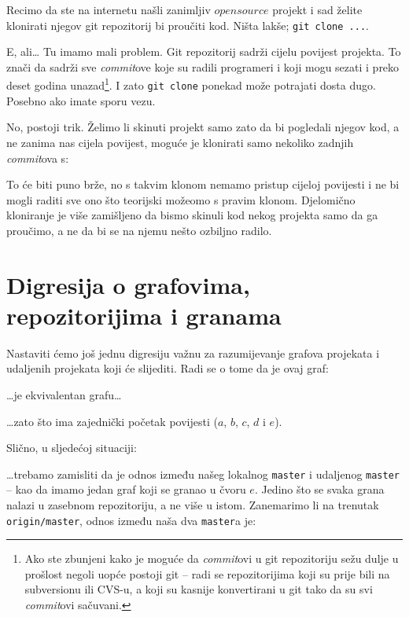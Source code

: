 Recimo da ste na internetu našli zanimljiv $open source$ projekt i sad želite klonirati njegov git repozitorij bi proučiti kod. 
Ništa lakše; \verb+git clone ...+.

E, ali\dots
Tu imamo mali problem.
Git repozitorij sadrži cijelu povijest projekta. 
To znači da sadrži sve \emph{commit}ove koje su radili programeri i koji mogu sezati i preko deset godina unazad\footnote{Ako ste zbunjeni kako je moguće da \emph{commit}ovi u git repozitoriju sežu dulje u prošlost negoli uopće postoji git -- radi se repozitorijima koji su prije bili na subversionu ili CVS-u, a koji su kasnije konvertirani u git tako da su svi \emph{commit}ovi sačuvani.}.
I zato \verb+git clone+ ponekad može potrajati dosta dugo. 
Posebno ako imate sporu vezu.

No, postoji trik.
Želimo li skinuti projekt samo zato da bi pogledali njegov kod, a ne zanima nas cijela povijest, moguće je klonirati samo nekoliko zadnjih \emph{commit}ova s:


To će biti puno brže, no s takvim klonom nemamo pristup cijeloj povijesti i ne bi mogli raditi sve ono što teorijski možeomo s pravim klonom. 
Djelomično kloniranje je više zamišljeno da bismo skinuli kod nekog projekta samo da ga proučimo, a ne da bi se na njemu nešto ozbiljno radilo.

\section*{Digresija o grafovima, repozitorijima i granama}

Nastaviti ćemo još jednu digresiju važnu za razumijevanje grafova projekata i udaljenih projekata koji će slijediti.
Radi se o tome da je ovaj graf:



\dots{}je ekvivalentan grafu\dots



\dots{}zato što ima zajednički početak povijesti ($a$, $b$, $c$, $d$ i $e$).

Slično, u sljedećoj situaciji:



\dots{}trebamo zamisliti da je odnos između našeg lokalnog \verb+master+ i udaljenog \verb+master+ -- kao da imamo jedan graf koji se granao u čvoru $e$.
Jedino što se svaka grana nalazi u zasebnom repozitoriju, a ne više u istom.
Zanemarimo li na trenutak \verb+origin/master+, odnos između naša dva \verb+master+a je:

